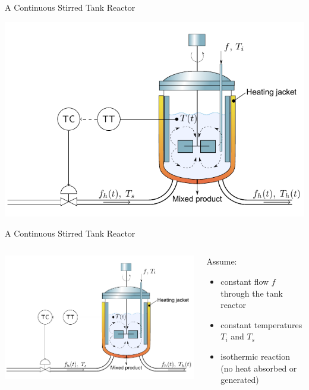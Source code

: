 \documentclass[presentation,aspectratio=169]{beamer}
\begin{document}
\begin{frame}[label={sec:org88f4fd1}]{A Continuous Stirred Tank Reactor}
\begin{center}
\includegraphics[height=0.8\textheight]{../../figures/stirred_tank_heat_exchange}
\end{center}
\end{frame}

\begin{frame}[label={sec:org8757cc0}]{A Continuous Stirred Tank Reactor}
\begin{columns}
\begin{column}{0.6\columnwidth}
\begin{center}
\includegraphics[height=0.6\textheight]{../../figures/stirred_tank_heat_exchange}
\end{center}
\end{column}

\begin{column}{0.4\columnwidth}
Assume:
\begin{itemize}
\item constant flow \(f\) through the tank reactor
\item constant temperatures \(T_i\) and \(T_s\)
\item isothermic reaction (no heat absorbed or generated)
\end{itemize}
\end{column}
\end{columns}
\end{frame}
\end{document}
